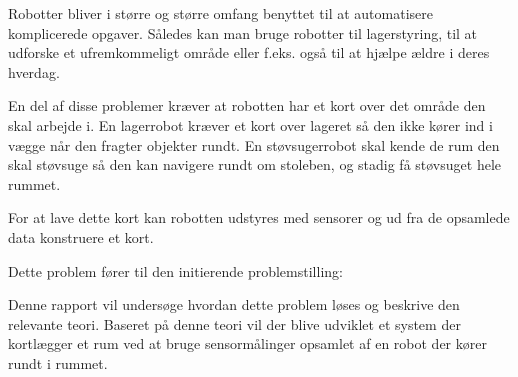 Robotter bliver i større og større omfang benyttet til at automatisere komplicerede opgaver.
Således kan man bruge robotter til lagerstyring, til at udforske et ufremkommeligt område eller f.eks. også til at hjælpe ældre i deres hverdag.

En del af disse problemer kræver at robotten har et kort over det område den skal arbejde i.
En lagerrobot kræver et kort over lageret så den ikke kører ind i vægge når den fragter objekter rundt.
En støvsugerrobot skal kende de rum den skal støvsuge så den kan navigere rundt om stoleben, og stadig få støvsuget hele rummet.

For at lave dette kort kan robotten udstyres med sensorer og ud fra de opsamlede data konstruere et kort.

Dette problem fører til den initierende problemstilling:

Denne rapport vil undersøge hvordan dette problem løses og beskrive den relevante teori.
Baseret på denne teori vil der blive udviklet et system der kortlægger et rum ved at bruge sensormålinger opsamlet af en robot der kører rundt i rummet.

